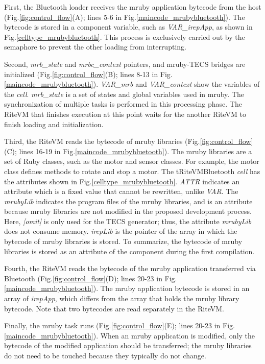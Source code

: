 \documentclass[S,R,E]{article/compsoft}
\begin{document}
First, the Bluetooth loader receives the mruby application bytecode from the host (Fig.\ref{fig:control_flow}(A); lines 5-6 in Fig.\ref{maincode_mrubybluetooth}).
The bytecode is stored in a component variable, such as {\it VAR\_irepApp}, as shown in Fig.\ref{celltype_mrubybluetooth}.
This process is exclusively carried out by the semaphore to prevent the other loading from interrupting.

Second, {\it mrb\_state} and {\it mrbc\_context} pointers, and mruby-TECS bridges are initialized (Fig.\ref{fig:control_flow}(B); lines 8-13 in Fig.\ref{maincode_mrubybluetooth}).
{\it VAR\_mrb} and {\it VAR\_context} show the variables of the {\it cell}.
{\it mrb\_state} is a set of states and global variables used in mruby.
The synchronization of multiple tasks is performed in this processing phase.
The RiteVM that finishes execution at this point waits for the another RiteVM to finish loading and initialization.

Third, the RiteVM reads the bytecode of mruby libraries (Fig.\ref{fig:control_flow}(C); lines 16-19 in Fig.\ref{maincode_mrubybluetooth}).
The mruby libraries are a set of Ruby classes, such as the motor and sensor classes.
For example, the motor class defines methods to rotate and stop a motor.
The tRiteVMBluetooth {\it cell} has the attributes shown in Fig.\ref{celltype_mrubybluetooth}.
{\it ATTR} indicates an attribute which is a fixed value that cannot be rewritten, unlike {\it VAR}.
The {\it mrubyLib} indicates the program files of the mruby libraries, and is an attribute because mruby libraries are not modified in the proposed development process.
Here, {\it [omit]} is only used for the TECS generator; thus, the attribute {\it mrubyLib} does not consume memory.
{\it irepLib} is the pointer of the array in which the bytecode of mruby libraries is stored.
To summarize, the bytecode of mruby libraries is stored as an attribute of the component during the first compilation.

Fourth, the RiteVM reads the bytecode of the mruby application transferred via Bluetooth (Fig.\ref{fig:control_flow}(D); lines 20-23 in Fig.\ref{maincode_mrubybluetooth}).
The mruby application bytecode is stored in an array of {\it irepApp}, which differs from the array that holds the mruby library bytecode.
Note that two bytecodes are read separately in the RiteVM.

Finally, the mruby task runs (Fig.\ref{fig:control_flow}(E); lines 20-23 in Fig.\ref{maincode_mrubybluetooth}).
When an mruby application is modified, only the bytecode of the modified application should be transferred; the mruby libraries do not need to be touched because they typically do not change.
\end{document}
